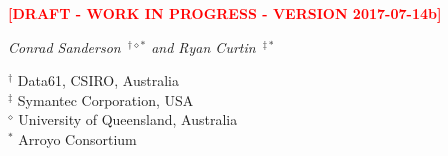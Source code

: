 \documentclass[11pt,a4paper]{article}
\begin{document}
\pagestyle{empty}
\lhead{}
\chead{}
\rhead{}
\lfoot{}
\cfoot{}
\rfoot{}


\centerline{\textcolor{red}{\bf[DRAFT - WORK IN PROGRESS - VERSION 2017-07-14b]}}

\begin{center}
{\Large\bf\doctitle}
\end{center}

\begin{center}

\begin{minipage}{0.5\textwidth}
{\large\it Conrad Sanderson~{$^{\dagger\diamond\ast}$} and Ryan Curtin~{$^{\ddagger\ast}$}}\\

\begin{small}
{$^\dagger$}  Data61, CSIRO, Australia\\
{$^\ddagger$} Symantec Corporation, USA\\
{$^\diamond$} University of Queensland, Australia\\
{$^\ast$}     Arroyo Consortium
\end{small}
\end{minipage}
\end{center}









\clearpage

\newpage
\appendix


\newpage


\end{document}
